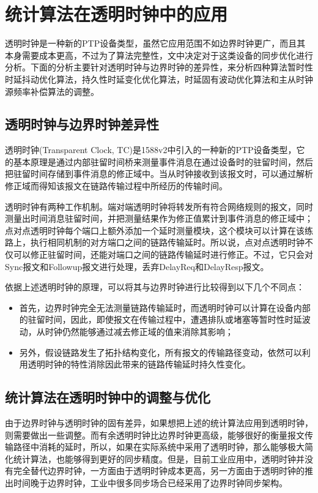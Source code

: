 \section{统计算法在透明时钟中的应用}
透明时钟是一种新的PTP设备类型，虽然它应用范围不如边界时钟更广，而且其本身需要成本更高，不过为了算法完整性，文中决定对于这类设备的同步优化进行分析。下面的分析主要针对透明时钟与边界时钟的差异性，来分析四种算法暂时性时延抖动优化算法，持久性时延变化优化算法，时延固有波动优化算法和主从时钟源频率补偿算法的调整。

\subsection{透明时钟与边界时钟差异性}
透明时钟(Transparent Clock, TC)是1588v2中引入的一种新的PTP设备类型，它的基本原理是通过内部驻留时间桥来测量事件消息在通过设备时的驻留时间，然后把驻留时间存储到事件消息的修正域中。当从时钟接收到该报文时，可以通过解析修正域而得知该报文在链路传输过程中所经历的传输时间。

透明时钟有两种工作机制。端对端透明时钟将转发所有符合网络规则的报文，同时测量出时间消息驻留时间，并把测量结果作为修正值累计到事件消息的修正域中；点对点透明时钟每个端口上额外添加一个延时测量模块，这个模块可以计算在该练路上，执行相同机制的对方端口之间的链路传输延时。所以说，点对点透明时钟不仅可以修正驻留时间，还能对端口之间的链路传输延时进行修正。不过，它只会对Sync报文和Followup报文进行处理，丢弃DelayReq和DelayResp报文。

依据上述透明时钟的原理，可以将其与边界时钟进行比较得到以下几个不同点：
\begin{itemize}[noitemsep,topsep=0pt,parsep=0pt,partopsep=0pt]
  \item 首先，边界时钟完全无法测量链路传输延时，而透明时钟可以计算在设备内部的驻留时间，因此，即使报文在传输过程中，遭遇排队或堵塞等暂时性时延波动，从时钟仍然能够通过减去修正域的值来消除其影响；
  \item 另外，假设链路发生了拓扑结构变化，所有报文的传输路径变动，依然可以利用透明时钟的特性消除因此带来的链路传输延时持久性变化。
\end{itemize}

\subsection{统计算法在透明时钟中的调整与优化}
由于边界时钟与透明时钟的固有差异，如果想把上述的统计算法应用到透明时钟，则需要做出一些调整。而有余透明时钟比边界时钟更高级，能够很好的衡量报文传输路径中消耗的延时，所以，如果在实际系统中采用了透明时钟，那么能够极大简化统计算法，也能够得到更好的同步精度。但是，目前工业应用中，透明时钟并没有完全替代边界时钟，一方面由于透明时钟成本更高，另一方面由于透明时钟的推出时间晚于边界时钟，工业中很多同步场合已经采用了边界时钟同步架构。


